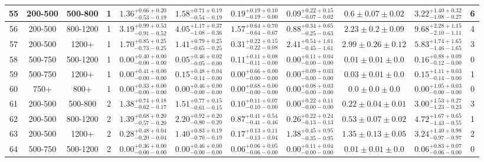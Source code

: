 \begin{table}
{\begin{tabular}{ |c|c|c|c||c|c|c|c|c||c|c| }
55 & 200-500 & 500-800 & 1 & $1.36^{+0.66+0.20}_{-0.53-0.19}$ & $1.58^{+0.71+0.19}_{-0.54-0.19}$ & $0.19^{+0.19+0.10}_{-0.19-0.00}$ & $0.09^{+0.22+0.15}_{-0.07-0.02}$ &$0.6\pm 0.07 \pm0.02$& $3.22^{+1.40+0.32}_{-1.08-0.27}$ & 6 \\ \hline
56 & 200-500 & 800-1200 & 1 & $3.19^{+0.99+0.53}_{-0.91-0.52}$ & $4.05^{+1.17+0.37}_{-1.08-0.36}$ & $1.57^{+0.64+0.70}_{-0.64-0.67}$ & $0.88^{+0.34+0.65}_{-0.25-0.63}$ &$2.23\pm 0.2 \pm0.09$& $9.68^{+2.28+1.15}_{-2.10-1.11}$ & 4 \\ \hline
57 & 200-500 & 1200+ & 1 & $1.70^{+0.85+0.25}_{-0.73-0.25}$ & $1.41^{+0.79+0.25}_{-0.65-0.25}$ & $0.31^{+0.22+0.15}_{-0.22-0.08}$ & $2.41^{+0.54+1.61}_{-0.45-1.61}$ &$2.99\pm 0.26 \pm0.12$& $5.83^{+1.74+1.65}_{-1.46-1.65}$ & 3 \\ \hline
58 & 500-750 & 500-1200 & 1 & $0.00^{+0.40+0.00}_{-0.00-0.00}$ & $0.05^{+0.46+0.02}_{-0.05-0.00}$ & $0.11^{+0.11+0.08}_{-0.11-0.00}$ & $0.00^{+0.11+0.04}_{-0.00-0.00}$ &$0.01\pm 0.01 \pm0.0$& $0.16^{+0.88+0.09}_{-0.12-0.00}$ & 0 \\ \hline
59 & 500-750 & 1200+ & 1 & $0.00^{+0.41+0.00}_{-0.00-0.00}$ & $0.15^{+0.48+0.04}_{-0.14-0.00}$ & $0.00^{+0.66+0.00}_{-0.00-0.00}$ & $0.00^{+0.09+0.03}_{-0.00-0.00}$ &$0.03\pm 0.01 \pm0.0$& $0.15^{+1.11+0.03}_{-0.14-0.00}$ & 1 \\ \hline
60 & 750+ & 800+ & 1 & $0.00^{+0.33+0.00}_{-0.00-0.00}$ & $0.00^{+0.46+0.00}_{-0.00-0.00}$ & $0.00^{+0.68+0.00}_{-0.00-0.00}$ & $0.00^{+0.08+0.03}_{-0.00-0.00}$ &$0.0\pm 0.0 \pm0.0$& $0.00^{+1.05+0.03}_{-0.00-0.00}$ & 0 \\ \hline
61 & 200-500 & 500-800 & 2 & $1.38^{+0.74+0.18}_{-0.62-0.17}$ & $1.51^{+0.77+0.15}_{-0.61-0.15}$ & $0.10^{+0.11+0.07}_{-0.10-0.00}$ & $0.00^{+0.22+0.11}_{-0.00-0.00}$ &$0.22\pm 0.04 \pm0.01$& $3.00^{+1.53+0.27}_{-1.23-0.23}$ & 3 \\ \hline
62 & 200-500 & 800-1200 & 2 & $1.39^{+0.68+0.20}_{-0.57-0.20}$ & $2.20^{+0.92+0.20}_{-0.80-0.20}$ & $0.87^{+0.41+0.54}_{-0.41-0.46}$ & $0.26^{+0.22+0.24}_{-0.13-0.13}$ &$0.53\pm 0.07 \pm0.02$& $4.72^{+1.67+0.65}_{-1.43-0.55}$ & 1 \\ \hline
63 & 200-500 & 1200+ & 2 & $0.28^{+0.48+0.04}_{-0.20-0.04}$ & $1.40^{+0.83+0.19}_{-0.70-0.19}$ & $0.17^{+0.13+0.11}_{-0.13-0.04}$ & $1.38^{+0.45+0.95}_{-0.35-0.95}$ &$1.35\pm 0.13 \pm0.05$& $3.24^{+1.40+0.98}_{-0.97-0.97}$ & 2 \\ \hline
64 & 500-750 & 500-1200 & 2 & $0.00^{+0.36+0.00}_{-0.00-0.00}$ & $0.00^{+0.46+0.00}_{-0.00-0.00}$ & $0.06^{+0.06+0.05}_{-0.06-0.00}$ & $0.00^{+0.11+0.04}_{-0.00-0.00}$ &$0.01\pm 0.01 \pm0.0$& $0.06^{+0.83+0.07}_{-0.06-0.00}$ & 0 \\ \hline

\end{tabular}}
\end{table}
